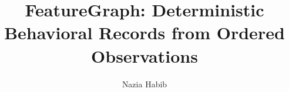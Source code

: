 \documentclass[11pt]{article}
\title{FeatureGraph: Deterministic Behavioral Records from Ordered Observations}
\author{Nazia Habib}
\date{}
\begin{document}
\maketitle

\begin{abstract}

\end{abstract}












\end{document}
